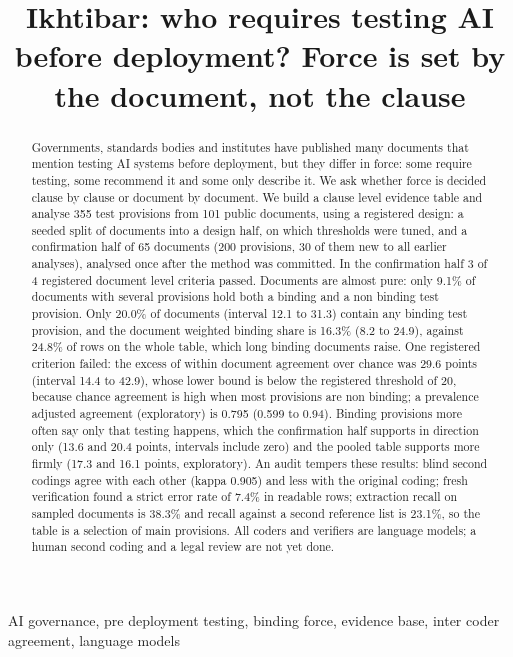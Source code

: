 \documentclass[conference]{IEEEtran}
\title{Ikhtibar: who requires testing AI before deployment? Force is set by the document, not the clause}
\author{\IEEEauthorblockN{Huda Mueen}\IEEEauthorblockA{\textit{Lead author}\\Independent researcher\\United Arab Emirates}\and\IEEEauthorblockN{Awaiz Ahmed}\IEEEauthorblockA{\textit{Dept.\ of Software Engineering}\\\textit{Al Ain University}\\Abu Dhabi, United Arab Emirates}}
\begin{document}
\maketitle

\begin{abstract}
Governments, standards bodies and institutes have published many documents that mention testing AI systems before deployment, but they differ in force: some require testing, some recommend it and some only describe it. We ask whether force is decided clause by clause or document by document. We build a clause level evidence table and analyse 355 test provisions from 101 public documents, using a registered design: a seeded split of documents into a design half, on which thresholds were tuned, and a confirmation half of 65 documents (200 provisions, 30 of them new to all earlier analyses), analysed once after the method was committed. In the confirmation half 3 of 4 registered document level criteria passed. Documents are almost pure: only 9.1\% of documents with several provisions hold both a binding and a non binding test provision. Only 20.0\% of documents (interval 12.1 to 31.3) contain any binding test provision, and the document weighted binding share is 16.3\% (8.2 to 24.9), against 24.8\% of rows on the whole table, which long binding documents raise. One registered criterion failed: the excess of within document agreement over chance was 29.6 points (interval 14.4 to 42.9), whose lower bound is below the registered threshold of 20, because chance agreement is high when most provisions are non binding; a prevalence adjusted agreement (exploratory) is 0.795 (0.599 to 0.94). Binding provisions more often say only that testing happens, which the confirmation half supports in direction only (13.6 and 20.4 points, intervals include zero) and the pooled table supports more firmly (17.3 and 16.1 points, exploratory). An audit tempers these results: blind second codings agree with each other (kappa 0.905) and less with the original coding; fresh verification found a strict error rate of 7.4\% in readable rows; extraction recall on sampled documents is 38.3\% and recall against a second reference list is 23.1\%, so the table is a selection of main provisions. All coders and verifiers are language models; a human second coding and a legal review are not yet done.
\end{abstract}

\begin{IEEEkeywords}
AI governance, pre deployment testing, binding force, evidence base, inter coder agreement, language models
\end{IEEEkeywords}
\end{document}
